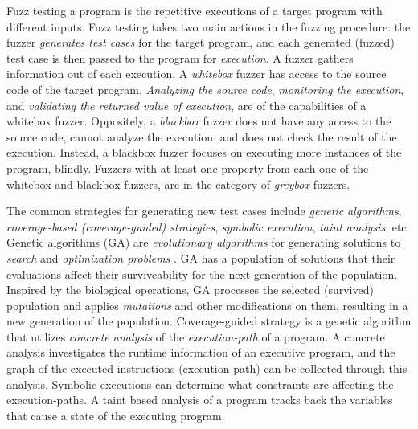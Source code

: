 Fuzz testing a program is the repetitive executions of a target program with different inputs. Fuzz testing takes two main actions in the fuzzing procedure: the fuzzer \textit{generates test cases} for the target program, and each generated (fuzzed) test case is then passed to the program for \textit{execution}. A fuzzer gathers information out of each execution. A \textit{whitebox} fuzzer has access to the source code of the target program. \textit{Analyzing the source code}, \textit{monitoring the execution}, and \textit{validating the returned value of execution}, are of the capabilities of a whitebox fuzzer. Oppositely, a \textit{blackbox} fuzzer does not have any access to the source code, cannot analyze the execution, and does not check the result of the execution. Instead, a blackbox fuzzer focuses on executing more instances of the program, blindly. Fuzzers with at least one property from each one of the whitebox and blackbox fuzzers, are in the category of \textit{greybox} fuzzers.

The common strategies for generating new test cases include \textit{genetic algorithms}, \textit{coverage-based (coverage-guided) strategies}, \textit{symbolic execution}, \textit{taint analysis}, etc. Genetic algorithms (GA) are \textit{evolutionary algorithms} for generating solutions to \textit{search} and \textit{optimization problems} \cite{banzhaf1998genetic, whitley1994genetic}. GA has a population of solutions that their evaluations affect their surviveability for the next generation of the population. Inspired by the biological operations, GA processes the selected (survived) population and applies \textit{mutations} and other modifications on them, resulting in a new generation of the population. Coverage-guided strategy is a genetic algorithm that utilizes \textit{concrete analysis} of the \textit{execution-path} of a program. A concrete analysis investigates the runtime information of an executive program, and the graph of the executed instructions (execution-path) can be collected through this analysis. Symbolic executions can determine what constraints are affecting the execution-paths. A taint based analysis of a program tracks back the variables that cause a state of the executing program.

